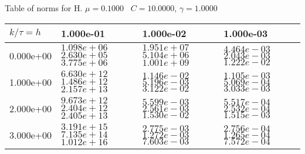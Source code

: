 \begin{center}
Table of norms for H. $\mu = 0.1000$ \, $C = 10.0000$, $\gamma = 1.0000$
  
\begin{tabular}{|p{1in}|p{1in}|p{1in}|p{1in}|} \hline
$k / \tau = h$ &1.000e-01 &1.000e-02 &1.000e-03 \\ \hline 
0.000e+00 & $1.098e+06$  $2.630e+05$  $3.775e+06$  & $1.951e+07$  $5.104e+06$  $1.001e+09$  & $4.464e-03$  $2.043e-03$  $1.222e-02$  \\ \hline 
1.000e+00 & $6.630e+12$  $1.486e+12$  $2.157e+13$  & $1.146e-02$  $5.196e-03$  $3.122e-02$  & $1.105e-03$  $5.069e-04$  $3.033e-03$  \\ \hline 
2.000e+00 & $9.673e+12$  $2.404e+12$  $2.405e+13$  & $5.599e-03$  $2.561e-03$  $1.530e-02$  & $5.517e-04$  $2.532e-04$  $1.515e-03$  \\ \hline 
3.000e+00 & $3.191e+15$  $7.135e+14$  $1.012e+16$  & $2.775e-03$  $1.272e-03$  $7.603e-03$  & $2.756e-04$  $1.265e-04$  $7.572e-04$  \\ \hline 

\end{tabular}\\[20pt]
\end{center}
